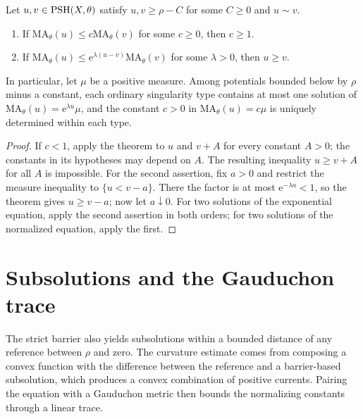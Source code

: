 \begin{corollary}\label{cor:big-barrier-orders}
Let $u,v\in\mathrm{PSH}(X,\theta)$ satisfy $u,v\geq\rho-C$ for some $C\geq0$ and $u\sim v$.
\begin{enumerate}
\item If $\mathrm{MA}_\theta(u)\leq c\mathrm{MA}_\theta(v)$ for some $c\geq0$, then $c\geq1$.
\item If $\mathrm{MA}_\theta(u)\leq \mathrm{e}^{\lambda(u-v)}\mathrm{MA}_\theta(v)$ for some $\lambda>0$, then $u\geq v$.
\end{enumerate}
In particular, let $\mu$ be a positive measure. Among potentials bounded below by $\rho$ minus a constant, each ordinary singularity type contains at most one solution of $\mathrm{MA}_\theta(u)=\mathrm{e}^{\lambda u}\mu$, and the constant $c>0$ in $\mathrm{MA}_\theta(u)=c\mu$ is uniquely determined within each type.
\end{corollary}
\begin{proof}
If $c<1$, apply the theorem to $u$ and $v+A$ for every constant $A>0$; the constants in its hypotheses may depend on $A$. The resulting inequality $u\geq v+A$ for all $A$ is impossible. For the second assertion, fix $a>0$ and restrict the measure inequality to $\{u<v-a\}$. There the factor is at most $\mathrm{e}^{-\lambda a}<1$, so the theorem gives $u\geq v-a$; now let $a\downarrow0$. For two solutions of the exponential equation, apply the second assertion in both orders; for two solutions of the normalized equation, apply the first.
\end{proof}

\section{Subsolutions and the Gauduchon trace}
\label{sec:big-minimal-estimates}

The strict barrier also yields subsolutions within a bounded distance of any reference between $\rho$ and zero. The curvature estimate comes from composing a convex function with the difference between the reference and a barrier-based subsolution, which produces a convex combination of positive currents. Pairing the equation with a Gauduchon metric then bounds the normalizing constants through a linear trace.

